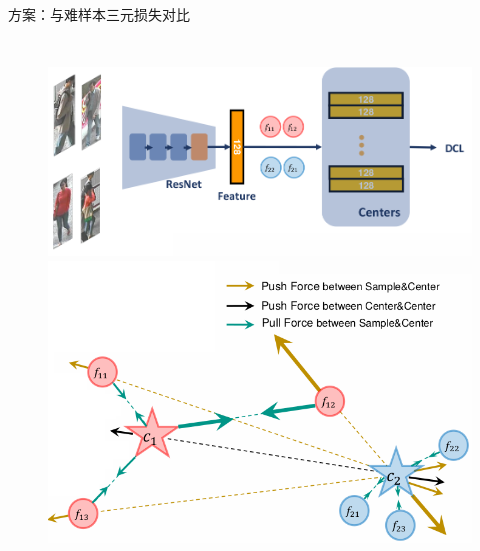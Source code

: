 \documentclass[usenames,dvipsnames,notes]{beamer}
\begin{document}
\begin{frame}{方案：与难样本三元损失对比}
\begin{columns}
		\begin{figure}
			\centering
			\includegraphics[width=\textwidth]{fig/over.png}
			\includegraphics[width=\textwidth]{fig/illu1.png}
		\end{figure}
	\end{columns}

\end{frame}
\end{document}
